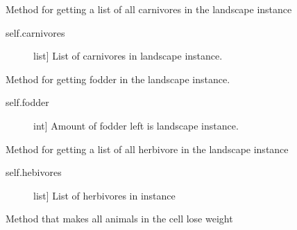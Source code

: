 \documentclass[a4paper,10pt,english]{sphinxmanual}
\begin{document}
\begin{fulllineitems}
\begin{fulllineitems}
\end{fulllineitems}


\begin{fulllineitems}
\label{\detokenize{landscape:biosim.landscape.Jungle.get_carnivores}}
Method for getting a list of all carnivores in the landscape instance
\begin{description}
\item[{self.carnivores}] \leavevmode{[}list{]}
List of carnivores in landscape instance.

\end{description}

\end{fulllineitems}


\begin{fulllineitems}
\label{\detokenize{landscape:biosim.landscape.Jungle.get_fodder}}
Method for getting fodder in the landscape instance.
\begin{description}
\item[{self.fodder}] \leavevmode{[}int{]}
Amount of fodder left is landscape instance.

\end{description}

\end{fulllineitems}


\begin{fulllineitems}
\label{\detokenize{landscape:biosim.landscape.Jungle.get_herbivores}}
Method for getting a list of all herbivore in the landscape instance
\begin{description}
\item[{self.hebivores}] \leavevmode{[}list{]}
List of herbivores in instance

\end{description}

\end{fulllineitems}


\begin{fulllineitems}
\label{\detokenize{landscape:biosim.landscape.Jungle.loss_of_weight}}
Method that makes all animals in the cell lose weight


\end{fulllineitems}
\end{fulllineitems}
\end{document}
